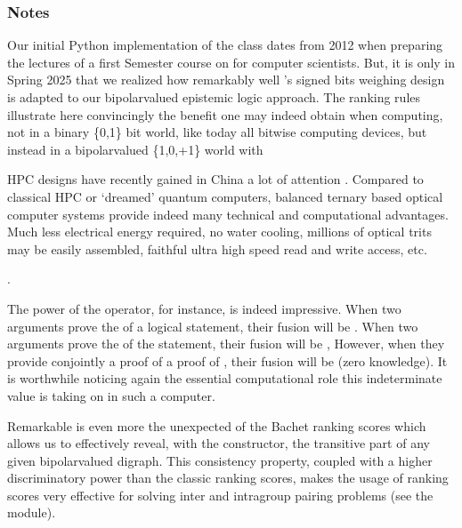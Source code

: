 \documentclass[a4paper,12pt,english]{sphinxhowto}
\begin{document}
\subsubsection{Notes}
\label{\detokenize{pearls:notes}}
\sphinxAtStartPar
Our initial Python implementation of the  class dates from 2012 when preparing the lectures of a first Semester course on  for computer scientists. But, it is only in Spring 2025 that we realized how remarkably well ’s signed bits weighing design is adapted to our bipolar\sphinxhyphen{}valued epistemic logic approach. The  ranking rules illustrate here convincingly the benefit one may indeed obtain when computing, not in a binary \{0,1\} bit world, like today all bit\sphinxhyphen{}wise computing devices, but instead in a bipolar\sphinxhyphen{}valued \{\sphinxhyphen{}1,0,+1\} world with  %
\begin{footnote}[26]\sphinxAtStartFootnote
{} HPC designs have recently gained in China a lot of attention . Compared to classical HPC or ‘dreamed’ quantum computers, balanced ternary based optical computer systems provide indeed many technical and computational advantages. Much less electrical energy required, no water cooling, millions of optical trits may be easily assembled, faithful ultra high speed read and write access, etc.
%
\end{footnote}.

\sphinxAtStartPar
The power of the  operator, for instance, is indeed impressive. When two arguments prove the  of a logical statement, their fusion will be . When two arguments prove the  of the statement, their fusion will be , However, when they provide conjointly a proof of   a proof of , their fusion will be  (zero knowledge). It is worthwhile noticing again the essential computational role this indeterminate  value is taking on in such a  computer.

\sphinxAtStartPar
Remarkable is even more the unexpected  of the  Bachet ranking scores which allows us to effectively reveal, with the  constructor, the transitive part of any given bipolar\sphinxhyphen{}valued digraph. This consistency property, coupled with a higher discriminatory power than the classic  ranking scores, makes the usage of  ranking scores very effective for solving inter\sphinxhyphen{} and intragroup pairing problems (see the  module).
\end{document}
